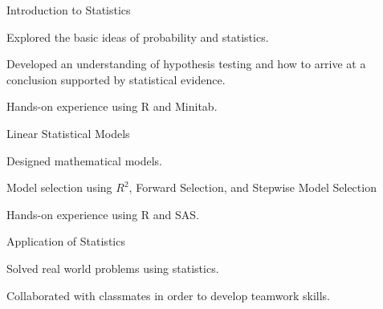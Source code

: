 

\begin{cventries}

  \cventry
    {Introduction to Statistics} %
    {} %
    {} %
    {} %
    {
    \begin{cvitems}
    \item Explored the basic ideas of probability and statistics.
    \item Developed an understanding of hypothesis testing and how to arrive at a conclusion supported by statistical evidence.
    \item Hands-on experience using R and Minitab.
    \end{cvitems}
    }

  \cventry
    {Linear Statistical Models} %
    {} %
    {} %
    {} %
    {
      \begin{cvitems}
      \item Designed mathematical models.
      \item Model selection using $R^2$, Forward Selection, and Stepwise Model Selection
      \item Hands-on experience using R and SAS.
      \end{cvitems}
    }

      \cventry
    {Application of Statistics} %
    {} %
    {} %
    {} %
    {
      \begin{cvitems}
      \item Solved real world problems using statistics.
        \item Collaborated with classmates in order to develop teamwork skills.
      \end{cvitems}
    }
\end{cventries}
